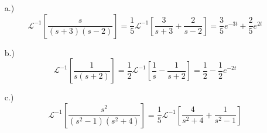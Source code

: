 \documentclass[12pt]{article}
\newcommand{\bracks}[1]{\left[#1\right]}
\newcommand{\lpi}{\mathcal{L}^{-1}}
\begin{document}
\pagestyle{fancy}
\fancyhead{}

\normalsize
\begin{itemize}
    \item [a.)] \[\lpi\bracks{\frac{s}{(s+3)(s-2)}}=\frac{1}{5}\lpi\bracks{\frac{3}{s+3}+\frac{2}{s-2}}=\frac{3}{5}e^{-3t}+\frac{2}{5}e^{2t}\]

    \item [b.)] \[\lpi\bracks{\frac{1}{s(s+2)}}=\frac{1}{2}\lpi\bracks{\frac{1}{s}-\frac{1}{s+2}}=\frac{1}{2}-\frac{1}{2}e^{-2t}\]

    \item [c.)] \[\lpi\bracks{\frac{s^2}{(s^2-1)(s^2+4)}}=\frac{1}{5}\lpi\bracks{\frac{4}{s^2+4}+\frac{1}{s^2-1}}\]
\end{itemize}
\end{document}
